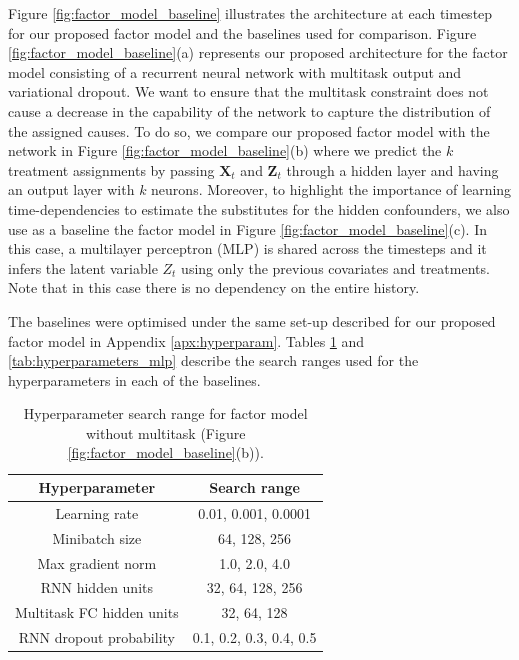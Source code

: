 \documentclass{article}
\newcommand{\vc}[1]{\mathbf{#1}}
\begin{document}
	
    Figure \ref{fig:factor_model_baseline} illustrates the architecture at each timestep for our proposed factor model and the baselines used for comparison. Figure \ref{fig:factor_model_baseline}(a) represents our proposed architecture for the factor model consisting of a recurrent neural network with multitask output and variational dropout. We want to ensure that the multitask constraint does not cause a decrease in the capability of the network to capture the distribution of the assigned causes. To do so, we compare our proposed factor model with the network in Figure \ref{fig:factor_model_baseline}(b) where we predict the $k$ treatment assignments by passing $\vc{X}_t$ and $\vc{Z}_t$ through a hidden layer and having an output layer with $k$ neurons. Moreover, to highlight the importance of learning time-dependencies to estimate the substitutes for the hidden confounders, we also use as a baseline the factor model in Figure \ref{fig:factor_model_baseline}(c). In this case, a multilayer perceptron (MLP) is shared across the timesteps and it infers the latent variable $Z_t$ using only the previous covariates and treatments. Note that in this case there is no dependency on the entire history.
	
	The baselines were optimised under the same set-up described for our proposed factor model in Appendix \ref{apx:hyperparam}. Tables \ref{tab:hyperparameters_multitaks} and \ref{tab:hyperparameters_mlp} describe the search ranges used for the hyperparameters in each of the baselines. 
	
	\begin{table}[ht]
		\caption{Hyperparameter search range for factor model without multitask (Figure \ref{fig:factor_model_baseline}(b)).}
		\label{tab:hyperparameters_multitaks}
		\vskip 0.15in
		\begin{center}
			\begin{small}
				\begin{tabular}{cc}
					\toprule
					Hyperparameter & Search range \\
					\hline
					\hline
					Learning rate &    0.01, 0.001, 0.0001    \\
					Minibatch size &  64, 128, 256  \\
					Max gradient norm & 1.0, 2.0, 4.0  \\
					RNN hidden units &  32, 64, 128, 256  \\
					Multitask FC hidden units & 32, 64, 128\\
					RNN dropout probability &  0.1, 0.2, 0.3, 0.4, 0.5 \\
					\bottomrule
				\end{tabular}
			\end{small}
		\end{center}
		\vskip -0.1in
	\end{table}
	
\end{document}
